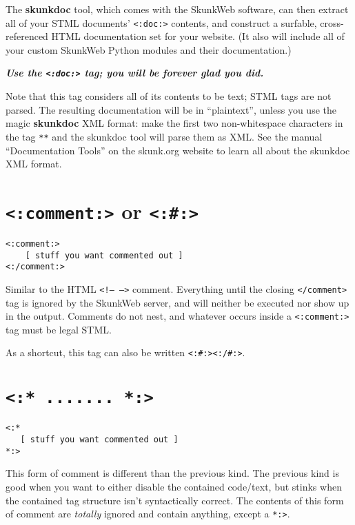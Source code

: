 \documentclass{manual}
\begin{document}
The \textbf{skunkdoc} tool, which comes with the SkunkWeb software, can
then extract all of your STML documents' \texttt{<:doc:>} 
contents, and construct a surfable, cross-referenced HTML
documentation set for your website. (It also will include all of
your custom SkunkWeb Python modules and their documentation.)

\textbf{\emph{Use the \texttt{<:doc:>}
tag; you will be forever glad you did.}}

Note that this tag considers all of its contents to be text; STML tags
are not parsed. The resulting documentation will be in ``plaintext'', unless
you use the magic \textbf{skunkdoc} XML format: make the first two
non-whitespace characters in the tag \texttt{**} and the skunkdoc tool
will parse them as XML. See the manual ``Documentation Tools'' on the skunk.org
website to learn all about the skunkdoc XML format.


\section{\texttt{<:comment:>} or \texttt{<:\#:>}}
\label{tagcomment}

\begin{verbatim}
<:comment:>
    [ stuff you want commented out ]
<:/comment:>
\end{verbatim}

Similar to the HTML \texttt{<!-- -->} comment. Everything until
the closing \texttt{</comment>} tag is ignored by the SkunkWeb server,
and will neither be executed nor show up in the output. 
Comments do not nest,
and whatever occurs inside a \texttt{<:comment:>} tag must
be legal STML. 

As a shortcut, this tag can also be written
\texttt{<:\#:><:/\#:>}.

   


\section{\texttt{<:* ....... *:>}}
\label{fullcomment}
\begin{verbatim}
<:*
   [ stuff you want commented out ]
*:>
\end{verbatim}

This form of comment is different than the previous kind.  The
previous kind is good when you want to either disable the contained
code/text, but stinks when the contained tag structure isn't
syntactically correct.  The contents of this form of comment are
\emph{totally} ignored and contain anything, except a \texttt{*:>}.
\end{document}
